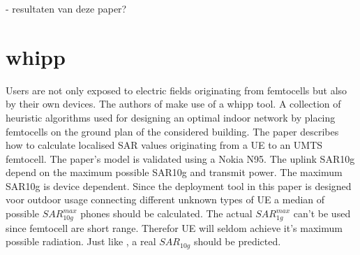 - resultaten van deze paper?


\section{whipp}
Users are not only exposed to electric fields originating from femtocells but also by their own devices. The authors of \cite{J10_RDP} make use of a \gls{whipp} tool. A collection
of heuristic algorithms used for designing an optimal indoor network by placing femtocells on the ground plan of the considered building. The paper describes how to calculate localised SAR values originating from a \gls{UE} to an UMTS femtocell.
The paper's model is validated using a Nokia N95. The uplink SAR10g depend on the maximum possible SAR10g and transmit power. The maximum SAR10g is device dependent. Since
the deployment tool in this paper is designed voor outdoor usage connecting different unknown types of \gls{UE} a median of possible $SAR^{max}_{10g}$ phones should be calculated.
The actual $SAR^{max}_{1g}$ can't be used since femtocell are short range. Therefor \gls{UE} will seldom achieve it's maximum possible radiation. Just like \cite{J10_RDP}, a real  $SAR_{10g}$ should be predicted.